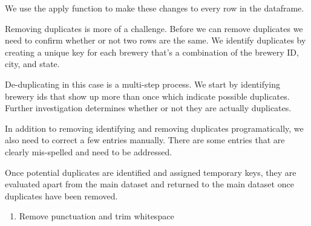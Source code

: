 \documentclass[]{article}
\newenvironment{Shaded}{\begin{snugshade}}{\end{snugshade}}
\newcommand{\KeywordTok}[1]{\textcolor[rgb]{0.13,0.29,0.53}{\textbf{#1}}}
\newcommand{\DataTypeTok}[1]{\textcolor[rgb]{0.13,0.29,0.53}{#1}}
\newcommand{\DecValTok}[1]{\textcolor[rgb]{0.00,0.00,0.81}{#1}}
\newcommand{\StringTok}[1]{\textcolor[rgb]{0.31,0.60,0.02}{#1}}
\newcommand{\CommentTok}[1]{\textcolor[rgb]{0.56,0.35,0.01}{\textit{#1}}}
\newcommand{\OtherTok}[1]{\textcolor[rgb]{0.56,0.35,0.01}{#1}}
\newcommand{\ControlFlowTok}[1]{\textcolor[rgb]{0.13,0.29,0.53}{\textbf{#1}}}
\newcommand{\OperatorTok}[1]{\textcolor[rgb]{0.81,0.36,0.00}{\textbf{#1}}}
\newcommand{\NormalTok}[1]{#1}
\providecommand{\tightlist}{%
  \setlength{\itemsep}{0pt}\setlength{\parskip}{0pt}}
\begin{document}
We use the apply function to make these changes to every row in the
dataframe.

Removing duplicates is more of a challenge. Before we can remove
duplicates we need to confirm whether or not two rows are the same. We
identify duplicates by creating a unique key for each brewery that's a
combination of the brewery ID, city, and state.

De-duplicating in this case is a multi-step process. We start by
identifying brewery ids that show up more than once which indicate
possible duplicates. Further investigation determines whether or not
they are actually duplicates.

In addition to removing identifying and removing duplicates
programatically, we also need to correct a few entries manually. There
are some entries that are clearly mis-spelled and need to be addressed.

Once potential duplicates are identified and assigned temporary keys,
they are evaluated apart from the main dataset and returned to the main
dataset once duplicates have been removed.

\begin{enumerate}
\def\labelenumi{\arabic{enumi})}
\tightlist
\item
  Remove punctuation and trim whitespace
\end{enumerate}

\begin{Shaded}
\end{Shaded}
\end{document}
